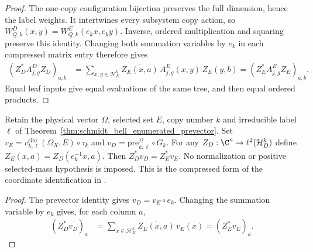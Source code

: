 \begin{proof}
    \leanok
    The one-copy configuration bijection preserves the full dimension,
    hence the label weights. It intertwines every subsystem copy action,
    so $W^D_{Q,k}(x,y)=W^E_{Q,k}(e_kx,e_ky)$.
    Inverse, ordered multiplication and squaring preserve this identity.
    Changing both summation variables by $e_k$ in each compressed matrix
    entry therefore gives
    \begin{align*}
        (Z_D^*A^D_{j,g}Z_D)_{a,b}
        & = \sum_{x,y\in\mathcal H_E^k}
        \overline{Z_E(x,a)}\,A^E_{j,g}(x,y)\,Z_E(y,b)
        = (Z_E^*A^E_{j,g}Z_E)_{a,b}.
    \end{align*}
    Equal leaf inputs give equal evaluations of the same tree, and then
    equal ordered products.
\end{proof}

\begin{theorem}
    \label{thm:schmidt_bell_enumerated_compressed_prevector}
    \leanok
    Retain the physical vector $\Omega$, selected set $E$, copy number $k$
    and irreducible label $\ell$ of
    Theorem~\ref{thm:schmidt_bell_enumerated_prevector}. Set
    $v_E=v^{\mathrm{site}}_{k,\ell}(\Omega_X,E)\circ\tau_k$ and
    $v_D=\mathrm{pre}_{k,\ell}^{\Omega}\circ G_k$.
    For any $Z_D:\C^n\to\ell^2(\mathcal H_D^k)$ define
    $Z_E(x,a)=Z_D(e_k^{-1}x,a)$. Then $Z_D^*v_D=Z_E^*v_E$.
    No normalization or positive selected-mass hypothesis is imposed.
    This is the compressed form of the coordinate identification in
    \cite[Section~8, lines~130--147, 240--254 and~283--290]{OpenAI2026AreaLaw}.
\end{theorem}
\begin{proof}
    \leanok
    The prevector identity gives $v_D=v_E\circ e_k$. Changing the summation
    variable by $e_k$ gives, for each column $a$,
    \begin{align*}
        (Z_D^*v_D)_a
        & = \sum_{x\in\mathcal H_E^k}\overline{Z_E(x,a)}\,v_E(x)
        = (Z_E^*v_E)_a.
    \end{align*}
\end{proof}
